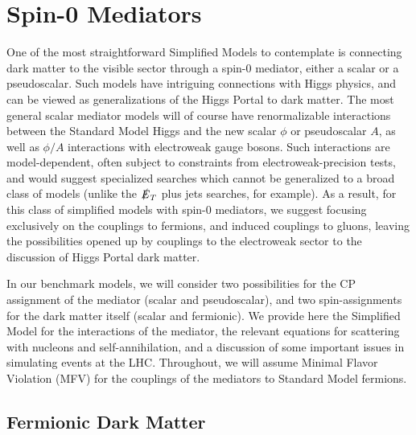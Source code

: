 \section{Spin-0 Mediators}

One of the most straightforward Simplified Models to contemplate is connecting dark matter to the visible sector through a spin-0 mediator, either a scalar or a pseudoscalar. Such models have intriguing connections with Higgs physics, and can be viewed as generalizations of the Higgs Portal to dark matter. The most general scalar mediator models will of course have renormalizable interactions between the Standard Model Higgs and the new scalar $\phi$ or pseudoscalar $A$, as well as $\phi/A$ interactions with electroweak gauge bosons. Such interactions are model-dependent, often subject to constraints from electroweak-precision tests, and would suggest specialized searches which cannot be generalized to a broad class of models (unlike the $\slashed{E}_T$ plus jets searches, for example). As a result, for this class of simplified models with spin-0 mediators, we suggest focusing exclusively on the couplings to fermions, and induced couplings to gluons, leaving the possibilities opened up by couplings to the electroweak sector to the discussion of Higgs Portal dark matter.

In our benchmark models, we will consider two possibilities for the CP assignment of the mediator (scalar and pseudoscalar), and two spin-assignments for the dark matter itself (scalar and fermionic). We provide here the Simplified Model for the interactions of the mediator, the relevant equations for scattering with nucleons and self-annihilation, and a discussion of some important issues in simulating events at the LHC. Throughout, we will assume Minimal Flavor Violation (MFV) for the couplings of the mediators to Standard Model fermions.

\subsection{Fermionic Dark Matter}

